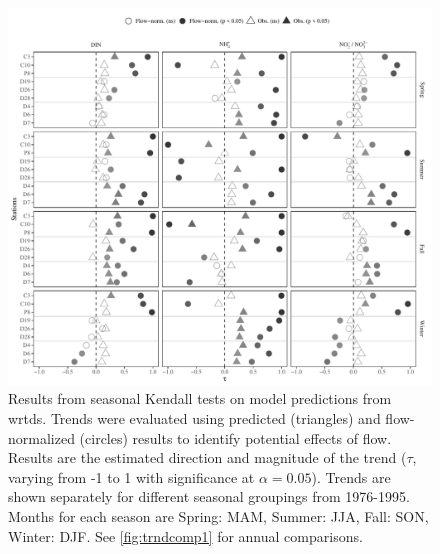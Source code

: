 \documentclass[journal = esthag, manuscript = article]{achemso}\usepackage[]{graphicx}\usepackage[]{color}
\newcommand{\beginsupplement}{%
        \setcounter{table}{0}
        \renewcommand{\thetable}{S\arabic{table}}%
        \setcounter{figure}{0}
        \renewcommand{\thefigure}{S\arabic{figure}}%
     }
\begin{document}
\clearpage

\begin{suppinfo}
\beginsupplement

\begin{figure}
\centering
\includegraphics[width=1\textwidth,page=1]{figs/trndcomp2.pdf}
\caption{Results from seasonal Kendall tests on model predictions from \ac{wrtds}. Trends were evaluated using predicted (triangles) and flow-normalized (circles) results to identify potential effects of flow. Results are the estimated direction and magnitude of the trend ($\tau$, varying from -1 to 1 with significance at $\alpha = 0.05$). Trends are shown separately for different seasonal groupings from 1976-1995. Months for each season are Spring: MAM, Summer: JJA, Fall: SON, Winter: DJF. See \cref{fig:trndcomp1} for annual comparisons.}
\label{fig:trndcomp2}   
\end{figure}


\end{suppinfo}
\end{document}
